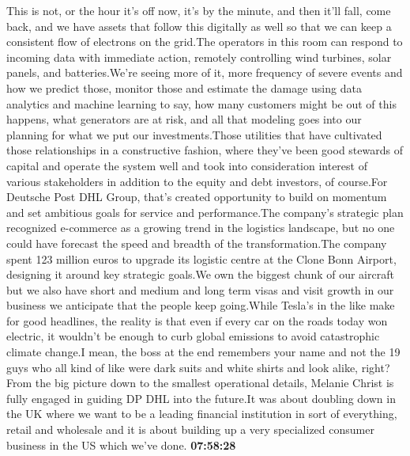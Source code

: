 \documentclass{article}%
\begin{document}
This is not, or the hour it's off now, it's by the minute, and then it'll fall, come back, and we have assets that follow this digitally as well so that we can keep a consistent flow of electrons on the grid.The operators in this room can respond to incoming data with immediate action, remotely controlling wind turbines, solar panels, and batteries.We're seeing more of it, more frequency of severe events and how we predict those, monitor those and estimate the damage using data analytics and machine learning to say, how many customers might be out of this happens, what generators are at risk, and all that modeling goes into our planning for what we put our investments.Those utilities that have cultivated those relationships in a constructive fashion, where they've been good stewards of capital and operate the system well and took into consideration interest of various stakeholders in addition to the equity and debt investors, of course.For Deutsche Post DHL Group, that's created opportunity to build on momentum and set ambitious goals for service and performance.The company's strategic plan recognized e{-}commerce as a growing trend in the logistics landscape, but no one could have forecast the speed and breadth of the transformation.The company spent 123 million euros to upgrade its logistic centre at the Clone Bonn Airport, designing it around key strategic goals.We own the biggest chunk of our aircraft but we also have short and medium and long term visas and visit growth in our business we anticipate that the people keep going.While Tesla's in the like make for good headlines, the reality is that even if every car on the roads today won electric, it wouldn't be enough to curb global emissions to avoid catastrophic climate change.I mean, the boss at the end remembers your name and not the 19 guys who all kind of like were dark suits and white shirts and look alike, right?From the big picture down to the smallest operational details, Melanie Christ is fully engaged in guiding DP DHL into the future.It was about doubling down in the UK where we want to be a leading financial institution in sort of everything, retail and wholesale and it is about building up a very specialized consumer business in the US which we've done.%
\textbf{07:58:28}%
\newline%
\end{document}

